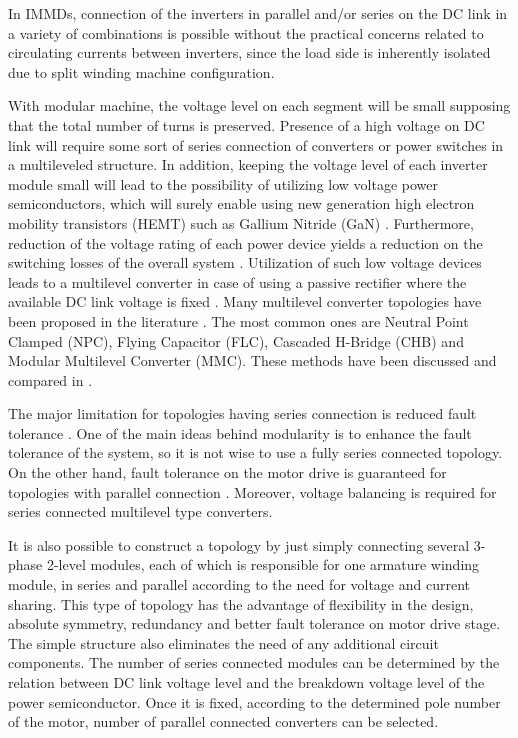 \documentclass[conference,a4paper,twocolumn]{IEEEtran}
\begin{document}
In IMMDs, connection of the inverters in parallel and/or series on the DC link in a variety of combinations is possible without the practical concerns related to circulating currents between inverters, since the load side is inherently isolated due to split winding machine configuration.

With modular machine, the voltage level on each segment will be small supposing that the total number of turns is preserved. Presence of a high voltage on DC link will require some sort of series connection of converters or power switches in a multileveled structure. In addition, keeping the voltage level of each inverter module small will lead to the possibility of utilizing low voltage power semiconductors, which will surely enable using new generation high electron mobility transistors (HEMT) such as Gallium Nitride (GaN) \cite{Wang2015}. Furthermore, reduction of the voltage rating of each power device yields a reduction on the switching losses of the overall system \cite{LoCalzo2016}. Utilization of such low voltage devices leads to a multilevel converter in case of using a passive rectifier where the available DC link voltage is fixed \cite{Wang2013}.
Many multilevel converter topologies have been proposed in the literature \cite{Wang2014}. The most common ones are Neutral Point Clamped (NPC), Flying Capacitor (FLC), Cascaded H-Bridge (CHB) and Modular Multilevel Converter (MMC). These methods have been discussed and compared in \cite{LoCalzo2016,Wang2014,Wang2015}.

The major limitation for topologies having series connection is reduced fault tolerance \cite{Galassini2015}. One of the main ideas behind modularity is to enhance the fault tolerance of the system, so it is not wise to use a fully series connected topology. On the other hand, fault tolerance on the motor drive is guaranteed for topologies with parallel connection \cite{Galassini2015}. Moreover, voltage balancing is required for series connected multilevel type converters.

It is also possible to construct a topology by just simply connecting several 3-phase 2-level modules, each of which is responsible for one armature winding module, in series and parallel according to the need for voltage and current sharing. This type of topology has the advantage of flexibility in the design, absolute symmetry, redundancy and better fault tolerance on motor drive stage. The simple structure also eliminates the need of any additional circuit components. The number of series connected modules can be determined by the relation between DC link voltage level and the breakdown voltage level of the power semiconductor. Once it is fixed, according to the determined pole number of the motor, number of parallel connected converters can be selected.
\end{document}
